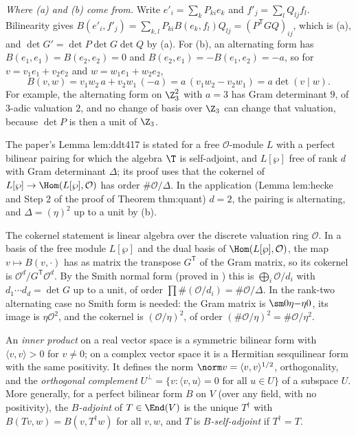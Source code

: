\emph{Where (a) and (b) come from.} Write $e'_i=\sum_kP_{ki}e_k$ and $f'_j=\sum_lQ_{lj}f_l$. Bilinearity
gives $B(e'_i,f'_j)=\sum_{k,l}P_{ki}B(e_k,f_l)Q_{lj}=(P^{\mathsf T}GQ)_{ij}$, which is (a), and
$\det G'=\det P\det G\det Q$ by (a). For (b), an alternating form has
$B(e_1,e_1)=B(e_2,e_2)=0$ and $B(e_2,e_1)=-B(e_1,e_2)=-a$, so for $v=v_1e_1+v_2e_2$ and
$w=w_1e_1+w_2e_2$,
\[
B(v,w)=v_1w_2\,a+v_2w_1\,(-a)=a\,(v_1w_2-v_2w_1)=a\det(v\mid w).
\]
For example, the alternating form on $\Z_3^2$ with $a=3$ has Gram determinant $9$, of $3$-adic
valuation $2$, and no change of basis over $\Z_3$ can change that valuation, because $\det P$ is then
a unit of $\Z_3$.

\begin{paperlink}\label{pl:prereq:gram}
The paper's Lemma lem:ddt417 is stated for a free $\mathcal O$-module $L$ with a perfect bilinear
pairing for which the algebra $\T$ is self-adjoint, and $L[\wp]$ free of rank $d$ with Gram
determinant $\Delta$; its proof uses that the cokernel of $L[\wp]\to\Hom(L[\wp],\mathcal O)$ has
order $\#\mathcal O/\Delta$. In the application (Lemma lem:hecke and Step 2 of the proof of Theorem
thm:quant) $d=2$, the pairing is alternating, and $\Delta=(\eta)^2$ up to a unit by
(b).

The cokernel statement is linear algebra over the discrete valuation ring $\mathcal O$. In a basis of
the free module $L[\wp]$ and the dual basis of $\Hom(L[\wp],\mathcal O)$, the map
$v\mapsto B(v,\cdot)$ has as matrix the transpose $G^{\mathsf T}$ of the Gram matrix, so its
cokernel is $\mathcal O^d/G^{\mathsf T}\mathcal O^d$. By the Smith normal form (proved in
) this is $\bigoplus_i\mathcal O/d_i$ with $d_1\cdots d_d=\det G$ up to a unit, of
order $\prod\#(\mathcal O/d_i)=\#\mathcal O/\Delta$. In the rank-two alternating case no Smith form
is needed: the Gram matrix is $\sm0\eta{-\eta}0$, its image is $\eta\mathcal O^2$, and the cokernel
is $(\mathcal O/\eta)^2$, of order $(\#\mathcal O/\eta)^2=\#\mathcal O/\eta^2$.
\end{paperlink}

\begin{definition}\label{def:prereq:inner}
An \emph{inner product} on a real vector space is a symmetric bilinear form with
$\langle v,v\rangle>0$ for $v\ne0$; on a complex vector space it is a Hermitian sesquilinear form
with the same positivity. It defines the norm $\norm v=\langle v,v\rangle^{1/2}$, orthogonality,
and the \emph{orthogonal complement} $U^\perp=\{v:\langle v,u\rangle=0\text{ for all }u\in U\}$ of
a subspace $U$. More generally, for a perfect bilinear form $B$ on $V$ (over any field, with no
positivity), the \emph{$B$-adjoint} of $T\in\End(V)$ is the unique $T^\dagger$ with
$B(Tv,w)=B(v,T^\dagger w)$ for all $v,w$, and $T$ is \emph{$B$-self-adjoint} if $T^\dagger=T$.
\end{definition}

